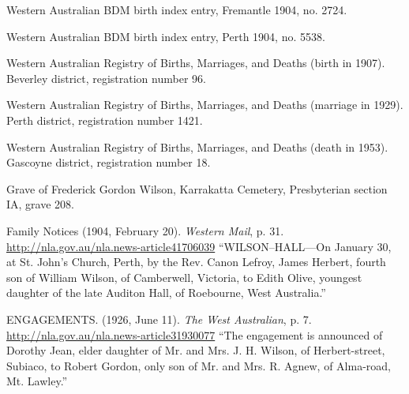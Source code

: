 \begin{thebibliography}{999}
	Western Australian BDM birth index entry, Fremantle 1904, no. 2724.

	Western Australian BDM birth index entry, Perth 1904, no. 5538.

	Western Australian Registry of Births, Marriages, and Deaths (birth in 1907). Beverley district, registration number 96.

	Western Australian Registry of Births, Marriages, and Deaths (marriage in 1929). Perth district, registration number 1421.

	Western Australian Registry of Births, Marriages, and Deaths (death in 1953). Gascoyne district, registration number 18.

	Grave of Frederick Gordon Wilson, Karrakatta Cemetery, Presbyterian section IA, grave 208.

	Family Notices (1904, February 20). \emph{Western Mail}, p. 31. \url{http://nla.gov.au/nla.news-article41706039}
	``WILSON--HALL---On January 30, at St. John's Church, Perth, by the Rev. Canon Lefroy,
	James Herbert, fourth son of William Wilson, of Camberwell, Victoria,
	to Edith Olive, youngest daughter of the late Auditon Hall, of Roebourne, West Australia.''

	ENGAGEMENTS. (1926, June 11). \emph{The West Australian}, p. 7. \url{http://nla.gov.au/nla.news-article31930077}
	``The engagement is announced of Dorothy Jean, elder daughter of Mr. and Mrs. J. H. Wilson, of Herbert-street, Subiaco,
	to Robert Gordon, only son of Mr. and Mrs. R. Agnew, of Alma-road, Mt. Lawley.''

\end{thebibliography}
